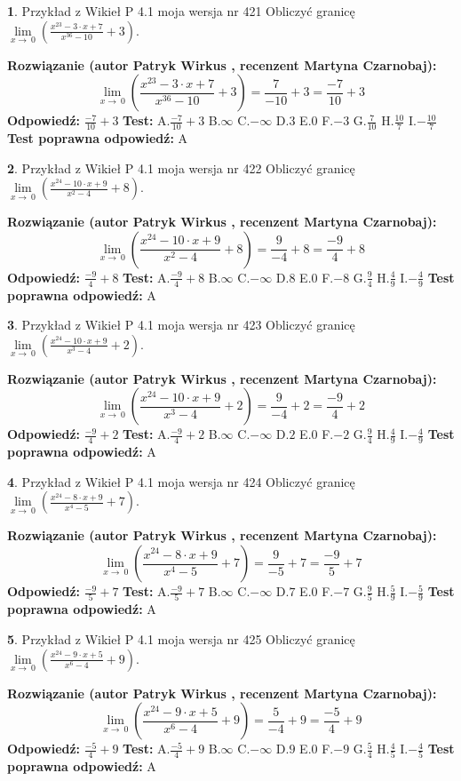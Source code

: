 \documentclass[12pt, a4paper]{article}
\theoremstyle{definition} %
\newtheorem{zad}{}
\newcommand{\zadStart}[1]{\begin{zad}#1\newline}
\newcommand{\zadStop}{\end{zad}}
\newcommand{\rozwStart}[2]{\noindent \textbf{Rozwiązanie (autor #1 , recenzent #2): }\newline}
\newcommand{\rozwStop}{\newline}
\newcommand{\odpStart}{\noindent \textbf{Odpowiedź:}\newline}
\newcommand{\odpStop}{\newline}
\newcommand{\testStart}{\noindent \textbf{Test:}\newline}
\newcommand{\testStop}{\newline}
\newcommand{\kluczStart}{\noindent \textbf{Test poprawna odpowiedź:}\newline}
\newcommand{\kluczStop}{\newline}
\begin{document}
\zadStart{Przykład z Wikieł P 4.1 moja wersja nr 421}
Obliczyć granicę $\lim\limits_{x\to\ 0}(\frac{x^{23}-3 \cdot x +7}{x^{36}-10}+3)$.
\zadStop
\rozwStart{Patryk Wirkus}{Martyna Czarnobaj}
$$\lim\limits_{x\to\ 0}(\frac{x^{23}-3 \cdot x +7}{x^{36}-10}+3)=\frac{7}{-10}+3=\frac{-7}{10}+3$$
\rozwStop
\odpStart
$\frac{-7}{10}+3$
\odpStop
\testStart
A.$\frac{-7}{10}+3$
B.$\infty$
C.$-\infty$
D.$3$
E.$0$
F.$-3$
G.$\frac{7}{10}$
H.$\frac{10}{7}$
I.$-\frac{10}{7}$
\testStop
\kluczStart
A
\kluczStop



\zadStart{Przykład z Wikieł P 4.1 moja wersja nr 422}
Obliczyć granicę $\lim\limits_{x\to\ 0}(\frac{x^{24}-10 \cdot x +9}{x^{2}-4}+8)$.
\zadStop
\rozwStart{Patryk Wirkus}{Martyna Czarnobaj}
$$\lim\limits_{x\to\ 0}(\frac{x^{24}-10 \cdot x +9}{x^{2}-4}+8)=\frac{9}{-4}+8=\frac{-9}{4}+8$$
\rozwStop
\odpStart
$\frac{-9}{4}+8$
\odpStop
\testStart
A.$\frac{-9}{4}+8$
B.$\infty$
C.$-\infty$
D.$8$
E.$0$
F.$-8$
G.$\frac{9}{4}$
H.$\frac{4}{9}$
I.$-\frac{4}{9}$
\testStop
\kluczStart
A
\kluczStop



\zadStart{Przykład z Wikieł P 4.1 moja wersja nr 423}
Obliczyć granicę $\lim\limits_{x\to\ 0}(\frac{x^{24}-10 \cdot x +9}{x^{3}-4}+2)$.
\zadStop
\rozwStart{Patryk Wirkus}{Martyna Czarnobaj}
$$\lim\limits_{x\to\ 0}(\frac{x^{24}-10 \cdot x +9}{x^{3}-4}+2)=\frac{9}{-4}+2=\frac{-9}{4}+2$$
\rozwStop
\odpStart
$\frac{-9}{4}+2$
\odpStop
\testStart
A.$\frac{-9}{4}+2$
B.$\infty$
C.$-\infty$
D.$2$
E.$0$
F.$-2$
G.$\frac{9}{4}$
H.$\frac{4}{9}$
I.$-\frac{4}{9}$
\testStop
\kluczStart
A
\kluczStop



\zadStart{Przykład z Wikieł P 4.1 moja wersja nr 424}
Obliczyć granicę $\lim\limits_{x\to\ 0}(\frac{x^{24}-8 \cdot x +9}{x^{4}-5}+7)$.
\zadStop
\rozwStart{Patryk Wirkus}{Martyna Czarnobaj}
$$\lim\limits_{x\to\ 0}(\frac{x^{24}-8 \cdot x +9}{x^{4}-5}+7)=\frac{9}{-5}+7=\frac{-9}{5}+7$$
\rozwStop
\odpStart
$\frac{-9}{5}+7$
\odpStop
\testStart
A.$\frac{-9}{5}+7$
B.$\infty$
C.$-\infty$
D.$7$
E.$0$
F.$-7$
G.$\frac{9}{5}$
H.$\frac{5}{9}$
I.$-\frac{5}{9}$
\testStop
\kluczStart
A
\kluczStop



\zadStart{Przykład z Wikieł P 4.1 moja wersja nr 425}
Obliczyć granicę $\lim\limits_{x\to\ 0}(\frac{x^{24}-9 \cdot x +5}{x^{6}-4}+9)$.
\zadStop
\rozwStart{Patryk Wirkus}{Martyna Czarnobaj}
$$\lim\limits_{x\to\ 0}(\frac{x^{24}-9 \cdot x +5}{x^{6}-4}+9)=\frac{5}{-4}+9=\frac{-5}{4}+9$$
\rozwStop
\odpStart
$\frac{-5}{4}+9$
\odpStop
\testStart
A.$\frac{-5}{4}+9$
B.$\infty$
C.$-\infty$
D.$9$
E.$0$
F.$-9$
G.$\frac{5}{4}$
H.$\frac{4}{5}$
I.$-\frac{4}{5}$
\testStop
\kluczStart
A
\kluczStop
\end{document}

